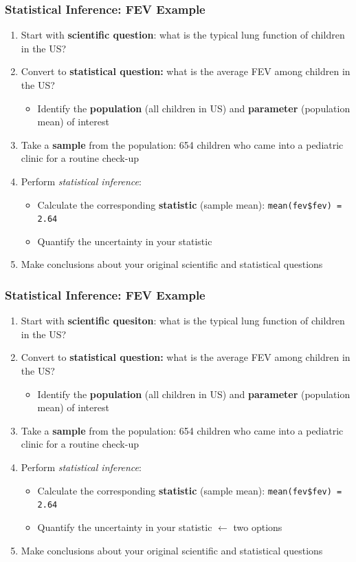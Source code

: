 \documentclass[12pt, 
hyperref={colorlinks=true, linkcolor=blue, urlcolor=cyan}]{beamer}
\begin{document}
\begin{frame}
\frametitle{Statistical Inference: FEV Example}

\begin{enumerate}
\item Start with \textbf{scientific question}: what is the typical lung function of children in the US?
\item Convert to \textbf{statistical question:} what is the average FEV among children in the US?
	\begin{itemize}
	\item Identify the \textbf{population} (all children in US) and \textbf{parameter} (population mean) of interest
	\end{itemize}
\item Take a \textbf{sample} from the population: 654 children who came into a pediatric clinic for a routine check-up
\item Perform \textit{statistical inference}:
	\begin{itemize}
	\item Calculate the corresponding \textbf{statistic} (sample mean): \texttt{mean(fev\$fev) = 2.64}
	\item Quantify the uncertainty in your statistic
	\end{itemize}
\item Make conclusions about your original scientific and statistical questions
\end{enumerate}
\end{frame}

\begin{frame}[noframenumbering]
\frametitle{Statistical Inference: FEV Example}
\begin{enumerate}
\item Start with \textbf{scientific quesiton}: what is the typical lung function of children in the US?
\item Convert to \textbf{statistical question:} what is the average FEV among children in the US?
	\begin{itemize}
	\item Identify the \textbf{population} (all children in US) and \textbf{parameter} (population mean) of interest
	\end{itemize}
\item Take a \textbf{sample} from the population: 654 children who came into a pediatric clinic for a routine check-up
\item Perform \textit{statistical inference}:
	\begin{itemize}
	\item Calculate the corresponding \textbf{statistic} (sample mean): \texttt{mean(fev\$fev) = 2.64}
	\item Quantify the uncertainty in your statistic \color{blue} $\leftarrow$ two options \color{black}
	\end{itemize}
\item Make conclusions about your original scientific and statistical questions
\end{enumerate}
\end{frame}
\end{document}
